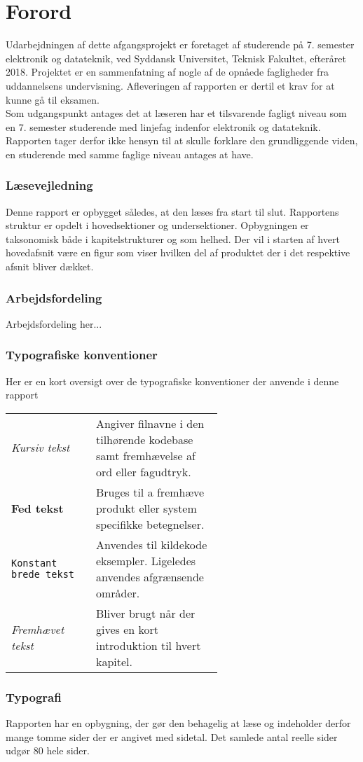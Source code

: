 \chapter*{Forord}\label{chap:forord}

Udarbejdningen af dette afgangsprojekt er foretaget af studerende på 7. semester elektronik og datateknik, ved Syddansk Universitet, Teknisk Fakultet, efteråret 2018. Projektet er en sammenfatning af nogle af de opnåede fagligheder fra uddannelsens undervisning. Afleveringen af rapporten er dertil et krav for at kunne gå til eksamen.\\

Som udgangspunkt antages det at læseren har et tilsvarende fagligt niveau som en 7. semester studerende med linjefag indenfor elektronik og datateknik.
Rapporten tager derfor ikke hensyn til at skulle forklare den grundliggende viden, en studerende med samme faglige niveau antages at have.

\subsection{Læsevejledning}
Denne rapport er opbygget således, at den læses fra start til slut. Rapportens struktur er opdelt i hovedsektioner og undersektioner. Opbygningen er taksonomisk både i kapitelstrukturer og som helhed. Der vil i starten af hvert hovedafsnit være en figur som viser hvilken del af produktet der i det respektive afsnit bliver dækket.

\subsection{Arbejdsfordeling}
Arbejdsfordeling her...

\subsection{Typografiske konventioner}
Her er en kort oversigt over de typografiske konventioner der anvende i denne rapport\\
\begin{tabular}{l p{0.6\linewidth}}
	\textit{Kursiv tekst}			& Angiver filnavne i den tilhørende kodebase samt fremhævelse af ord eller fagudtryk. \\
	\textbf{Fed tekst}				& Bruges til a fremhæve produkt eller system specifikke betegnelser.\\
	\texttt{Konstant brede tekst}	& Anvendes til kildekode eksempler. Ligeledes anvendes afgrænsende områder.\\
	\emph{Fremhævet tekst}		    & Bliver brugt når der gives en kort introduktion til hvert kapitel.\\
\end{tabular}

\subsection{Typografi}
Rapporten har en opbygning, der gør den behagelig at læse og indeholder derfor mange tomme sider der er angivet med sidetal.
Det samlede antal reelle sider udgør 80 hele sider. 